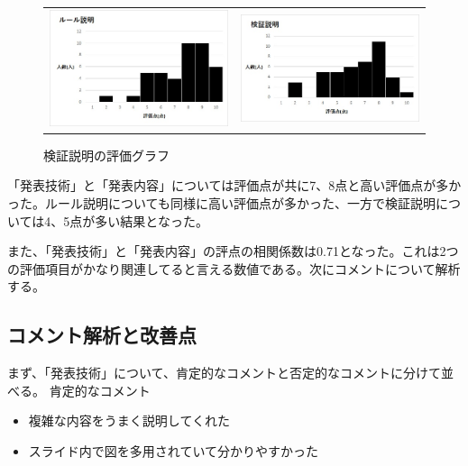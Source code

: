 \begin{figure}[h]
 \begin{tabular}{cc}
  \begin{minipage}[h]{0.45\hsize}
  \centering
 \includegraphics[width=0.7\linewidth]{./figure/ru-ru.jpg}
\caption{ルール説明の評価グラフ}
\label{ru-ru}
 \end{minipage} &

\begin{minipage}[h]{0.45\hsize}
  \centering
 \includegraphics[width=0.7\linewidth]{./figure/kensyou.jpg}
 \caption{検証説明の評価グラフ}
\label{kensyou}
\end{minipage} 
\end{tabular}
\end{figure}
「発表技術」と「発表内容」については評価点が共に7、8点と高い評価点が多かった。ルール説明についても同様に高い評価点が多かった、一方で検証説明については4、5点が多い結果となった。

また、「発表技術」と「発表内容」の評点の相関係数は0.71となった。これは2つの評価項目がかなり関連してると言える数値である。次にコメントについて解析する。

\subsection{コメント解析と改善点}
まず、「発表技術」について、肯定的なコメントと否定的なコメントに分けて並べる。
肯定的なコメント
\begin{itemize}
\item 複雑な内容をうまく説明してくれた
\item スライド内で図を多用されていて分かりやすかった
\end{itemize}

